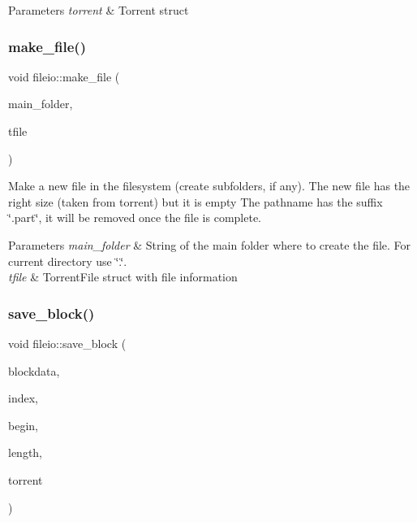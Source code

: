 \begin{DoxyParams}{Parameters}
{\em torrent} & Torrent struct \\
\hline
\end{DoxyParams}
\mbox{\label{namespacefileio_a2c09e8f358ac78b947433b69afa0c277}} 
\subsubsection{\texorpdfstring{make\+\_\+file()}{make\_file()}}
{\footnotesize\ttfamily void fileio\+::make\+\_\+file (\begin{DoxyParamCaption}\item[{const string \&}]{main\+\_\+folder,  }\item[{const \hyperlink{structtorr_1_1TorrentFile}{Torrent\+File} \&}]{tfile }\end{DoxyParamCaption})}



Make a new file in the filesystem (create subfolders, if any). The new file has the right size (taken from torrent) but it is empty The pathname has the suffix \char`\"{}.\+part\char`\"{}, it will be removed once the file is complete. 


\begin{DoxyParams}{Parameters}
{\em main\+\_\+folder} & String of the main folder where to create the file. For current directory use \char`\"{}.\char`\"{}. \\
\hline
{\em tfile} & Torrent\+File struct with file information \\
\hline
\end{DoxyParams}
\mbox{\label{namespacefileio_acc37418d350d6d36c3f691c99de9cf39}} 
\subsubsection{\texorpdfstring{save\+\_\+block()}{save\_block()}}
{\footnotesize\ttfamily void fileio\+::save\+\_\+block (\begin{DoxyParamCaption}\item[{char $\ast$}]{blockdata,  }\item[{size\+\_\+t}]{index,  }\item[{size\+\_\+t}]{begin,  }\item[{size\+\_\+t}]{length,  }\item[{\hyperlink{structtorr_1_1Torrent}{Torrent} \&}]{torrent }\end{DoxyParamCaption})}



